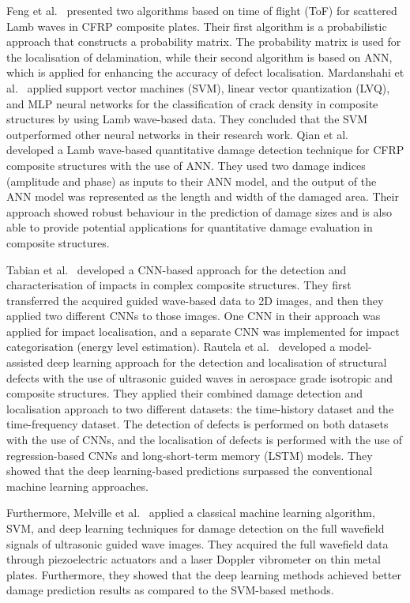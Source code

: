 Feng et al.~\cite{feng2019locating} presented two algorithms based on time of flight (ToF) for scattered Lamb waves in CFRP composite plates.
Their first algorithm is a probabilistic approach that constructs a probability matrix. 
The probability matrix is used for the localisation of delamination, while their second algorithm is based on ANN, which is applied for enhancing the accuracy of defect localisation.
Mardanshahi et al.~\cite{mardanshahi2020detection} applied support vector machines (SVM), linear vector quantization (LVQ), and MLP neural networks for the classification of crack density in composite structures by using Lamb wave-based data.
They concluded that the SVM outperformed other neural networks in their research work.
Qian et al.~\cite{qian2020application} developed a Lamb wave-based quantitative damage detection technique for CFRP composite structures with the use of ANN.
They used two damage indices (amplitude and phase) as inputs to their ANN model, and the output of the ANN model was represented as the length and width of the damaged area.
Their approach showed robust behaviour in the prediction of damage sizes and is also able to provide potential applications for quantitative damage evaluation in composite structures.

Tabian et al.~\cite{Tabian2019} developed a CNN-based approach for the detection and characterisation of impacts in complex composite structures.
They first transferred the acquired guided wave-based data to 2D images, and then they applied two different CNNs to those images.
One CNN in their approach was applied for impact localisation, and a separate CNN was implemented for impact categorisation (energy level estimation).
Rautela et al.~\cite{rautela2021ultrasonic} developed a model-assisted deep learning approach for the detection and localisation of structural defects with the use of ultrasonic guided waves in aerospace grade isotropic and composite structures. 
They applied their combined damage detection and localisation approach to two different datasets: the time-history dataset and the time-frequency dataset. 
The detection of defects is performed on both datasets with the use of CNNs, and the localisation of defects is performed with the use of regression-based CNNs and long-short-term memory (LSTM) models. 
They showed that the deep learning-based predictions surpassed the conventional machine learning approaches.

Furthermore, Melville et al.~\cite{Melville2018} applied a classical machine learning algorithm, SVM, and deep learning techniques for damage detection on the full wavefield signals of ultrasonic guided wave images.
They acquired the full wavefield data through piezoelectric actuators and a laser Doppler vibrometer on thin metal plates.
Furthermore, they showed that the deep learning methods achieved better damage prediction results as compared to the SVM-based methods.

